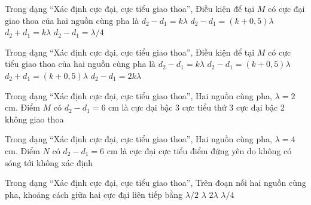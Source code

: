 \begin{ex}
Trong dạng “Xác định cực đại, cực tiểu giao thoa”, Điều kiện để tại $M$ có cực đại giao thoa của hai nguồn cùng pha là
\choice
{\True $d_2-d_1=k\lambda$}
{$d_2-d_1=(k+0,5)\lambda$}
{$d_2+d_1=k\lambda$}
{$d_2-d_1=\lambda/4$}
\end{ex}

\begin{ex}
Trong dạng “Xác định cực đại, cực tiểu giao thoa”, Điều kiện để tại $M$ có cực tiểu giao thoa của hai nguồn cùng pha là
\choice
{$d_2-d_1=k\lambda$}
{\True $d_2-d_1=(k+0,5)\lambda$}
{$d_2+d_1=(k+0,5)\lambda$}
{$d_2-d_1=2k\lambda$}
\end{ex}

\begin{ex}
Trong dạng “Xác định cực đại, cực tiểu giao thoa”, Hai nguồn cùng pha, $\lambda=2$ cm. Điểm $M$ có $d_2-d_1=6$ cm là
\choice
{\True cực đại bậc 3}
{cực tiểu thứ 3}
{cực đại bậc 2}
{không giao thoa}
\end{ex}

\begin{ex}
Trong dạng “Xác định cực đại, cực tiểu giao thoa”, Hai nguồn cùng pha, $\lambda=4$ cm. Điểm $N$ có $d_2-d_1=6$ cm là
\choice
{cực đại}
{\True cực tiểu}
{điểm đứng yên do không có sóng tới}
{không xác định}
\end{ex}

\begin{ex}
Trong dạng “Xác định cực đại, cực tiểu giao thoa”, Trên đoạn nối hai nguồn cùng pha, khoảng cách giữa hai cực đại liên tiếp bằng
\choice
{\True $\lambda/2$}
{$\lambda$}
{$2\lambda$}
{$\lambda/4$}
\end{ex}

